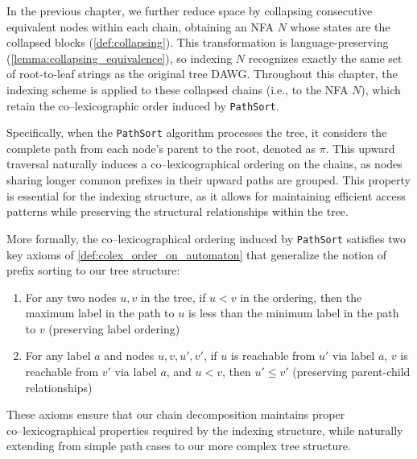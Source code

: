 In the previous chapter, we further reduce space by collapsing consecutive equivalent nodes within each chain, obtaining an NFA $N$ whose states are the collapsed blocks (\cref{def:collapsing}). This transformation is language-preserving (\cref{lemma:collapsing_equivalence}), so indexing $N$ recognizes exactly the same set of root-to-leaf strings as the original tree DAWG. Throughout this chapter, the indexing scheme is applied to these collapsed chains (i.e., to the NFA $N$), which retain the co--lexicographic order induced by \texttt{PathSort}.

Specifically, when the \texttt{PathSort} algorithm processes the tree, it considers the complete path from each node's parent to the root, denoted as $\pi$. This upward traversal naturally induces a co--lexicographical ordering on the chains, as nodes sharing longer common prefixes in their upward paths are grouped. This property is essential for the indexing structure, as it allows for maintaining efficient access patterns while preserving the structural relationships within the tree.

More formally, the co--lexicographical ordering induced by \texttt{PathSort} satisfies two key axioms of \cref{def:colex_order_on_automaton} that generalize the notion of prefix sorting to our tree structure:

\begin{enumerate}
    \item For any two nodes $u,v$ in the tree, if $u < v$ in the ordering, then the maximum label in the path to $u$ is less than the minimum label in the path to $v$ (preserving label ordering)
    \item For any label $a$ and nodes $u,v,u',v'$, if $u$ is reachable from $u'$ via label $a$, $v$ is reachable from $v'$ via label $a$, and $u < v$, then $u' \leq v'$ (preserving parent-child relationships)
\end{enumerate}

These axioms ensure that our chain decomposition maintains proper\\ co--lexicographical properties required by the indexing structure, while naturally extending from simple path cases to our more complex tree structure.

